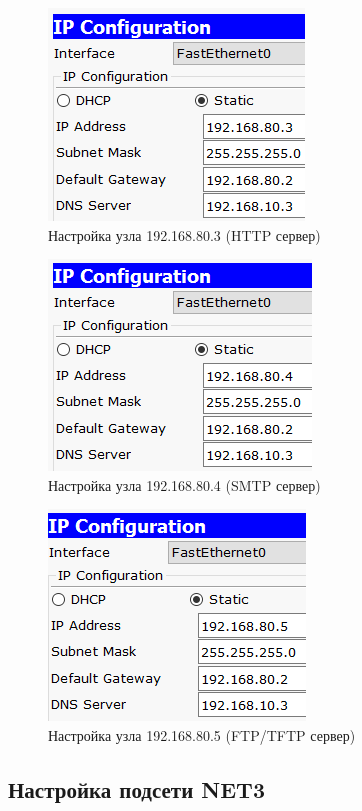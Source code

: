 \begin{figure}[h!]
	\centering
	\includegraphics[scale = 0.64]{images/2_2.png}
	\caption{Настройка узла 192.168.80.3 (HTTP сервер)}
	\label{image:2_2}
\end{figure}

\begin{figure}[h!]
	\centering
	\includegraphics[scale = 0.65]{images/2_3.png}
	\caption{Настройка узла 192.168.80.4 (SMTP сервер)}
	\label{image:2_3}
\end{figure}

\begin{figure}[h!]
	\centering
	\includegraphics[scale = 0.65]{images/2_4.png}
	\caption{Настройка узла 192.168.80.5 (FTP/TFTP сервер)}
	\label{image:2_4}
\end{figure}

\subsection{Настройка подсети NET3}

